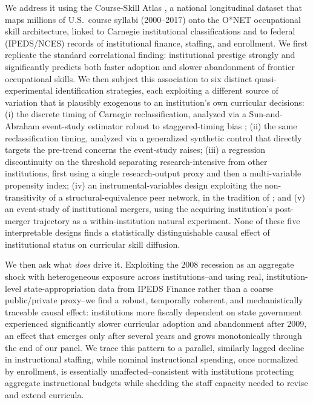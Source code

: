 \documentclass[11pt, letterpaper]{article}
\newcommand{\parencite}[1]{\cite{#1}}
\newcommand{\textcite}[1]{\cite{#1}}
\begin{document}
We address it using the Course-Skill Atlas \parencite{javadiansabet2024}, a national longitudinal dataset that maps millions of U.S.\ course syllabi (2000--2017) onto the O*NET occupational skill architecture, linked to Carnegie institutional classifications and to federal (IPEDS/NCES) records of institutional finance, staffing, and enrollment. We first replicate the standard correlational finding: institutional prestige strongly and significantly predicts both faster adoption and slower abandonment of frontier occupational skills. We then subject this association to six distinct quasi-experimental identification strategies, each exploiting a different source of variation that is plausibly exogenous to an institution's own curricular decisions: (i) the discrete timing of Carnegie reclassification, analyzed via a Sun-and-Abraham \parencite{sunabraham2021} event-study estimator robust to staggered-timing bias \parencite{goodmanbacon2021}; (ii) the same reclassification timing, analyzed via a generalized synthetic control \parencite{xu2017} that directly targets the pre-trend concerns the event-study raises; (iii) a regression discontinuity \parencite{calonico2014} on the threshold separating research-intensive from other institutions, first using a single research-output proxy and then a multi-variable propensity index; (iv) an instrumental-variables design exploiting the non-transitivity of a structural-equivalence peer network, in the tradition of \textcite{bramoulle2009}; and (v) an event-study of institutional mergers, using the acquiring institution's post-merger trajectory as a within-institution natural experiment. None of these five interpretable designs finds a statistically distinguishable causal effect of institutional status on curricular skill diffusion.

We then ask what \emph{does} drive it. Exploiting the 2008 recession as an aggregate shock with heterogeneous exposure across institutions--and using real, institution-level state-appropriation data from IPEDS Finance rather than a coarse public/private proxy--we find a robust, temporally coherent, and mechanistically traceable causal effect: institutions more fiscally dependent on state government experienced significantly slower curricular adoption and abandonment after 2009, an effect that emerges only after several years and grows monotonically through the end of our panel. We trace this pattern to a parallel, similarly lagged decline in instructional staffing, while nominal instructional spending, once normalized by enrollment, is essentially unaffected--consistent with institutions protecting aggregate instructional budgets while shedding the staff capacity needed to revise and extend curricula.
\end{document}
